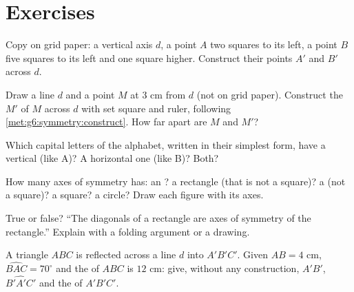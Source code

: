 \section{Exercises}

\begin{exercise}[$\star$]\label{exo:g6:symmetry:1}
Copy on grid paper: a vertical axis $d$, a point $A$ two squares to its
left, a point $B$ five squares to its left and one square higher.
Construct their  points $A'$ and $B'$ across $d$.
\end{exercise}

\begin{exercise}[$\star$]\label{exo:g6:symmetry:2}
Draw a line $d$ and a point $M$ at $3$ cm from $d$ (not on grid
paper). Construct the  $M'$ of $M$ across $d$ with set square
and ruler, following \cref{met:g6:symmetry:construct}. How far apart
are $M$ and $M'$?
\end{exercise}

\begin{exercise}[$\star$]\label{exo:g6:symmetry:3}
Which capital letters of the alphabet, written in their simplest form,
have a vertical  (like A)? A horizontal one (like B)?
Both?
\end{exercise}

\begin{exercise}[$\star$]\label{exo:g6:symmetry:4}
How many axes of symmetry has: an ? a rectangle
(that is not a square)? a  (not a square)? a square? a circle?
Draw each figure with its axes.
\end{exercise}

\begin{exercise}[$\star$]\label{exo:g6:symmetry:5}
True or false? ``The diagonals of a rectangle are axes of symmetry of
the rectangle.'' Explain with a folding argument or a drawing.
\end{exercise}

\begin{exercise}[$\star$]\label{exo:g6:symmetry:6}
A triangle $ABC$ is reflected across a line $d$ into $A'B'C'$. Given
$AB = 4$ cm, $\widehat{BAC} = 70^\circ$ and the  of $ABC$ is
$12$ cm: give, without any construction, $A'B'$,
$\widehat{B'A'C'}$ and the  of $A'B'C'$.
\end{exercise}

